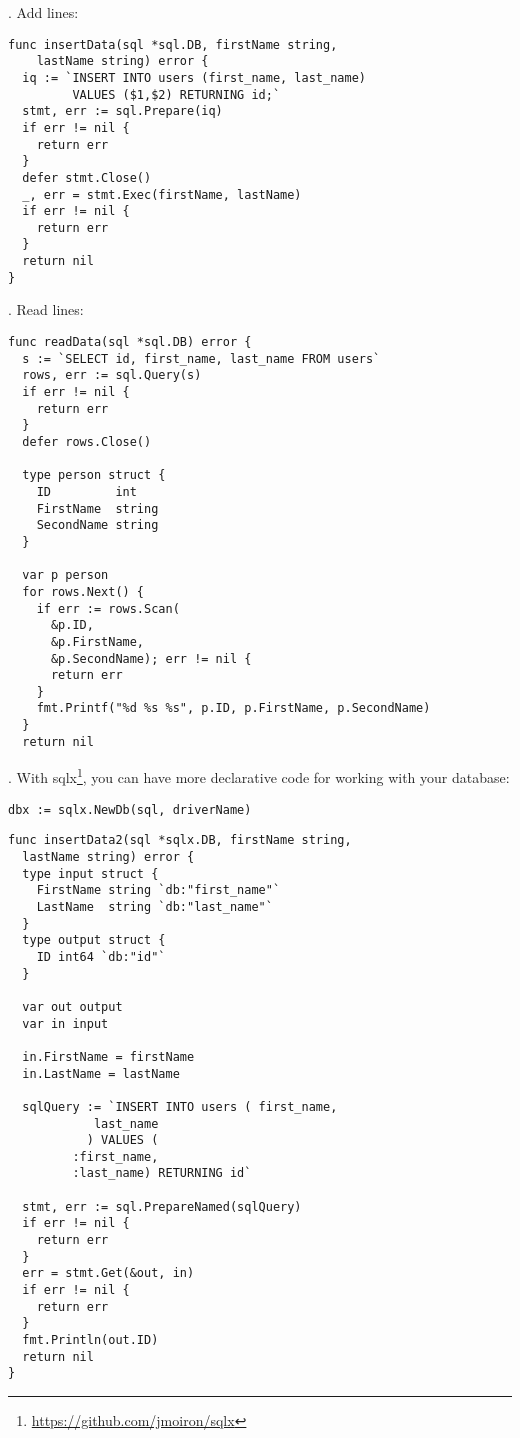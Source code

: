 \documentclass[11pt, letterpaper]{article}
\begin{document}
. Add lines:

\begin{verbatim}
func insertData(sql *sql.DB, firstName string,
    lastName string) error {
  iq := `INSERT INTO users (first_name, last_name)
         VALUES ($1,$2) RETURNING id;`
  stmt, err := sql.Prepare(iq)
  if err != nil {
    return err
  }
  defer stmt.Close()
  _, err = stmt.Exec(firstName, lastName)
  if err != nil {
    return err
  }
  return nil
}
\end{verbatim}


. Read lines:

\begin{verbatim}
func readData(sql *sql.DB) error {
  s := `SELECT id, first_name, last_name FROM users`
  rows, err := sql.Query(s)
  if err != nil {
    return err
  }
  defer rows.Close()

  type person struct {
    ID         int
    FirstName  string
    SecondName string
  }

  var p person
  for rows.Next() {
    if err := rows.Scan(
      &p.ID,
      &p.FirstName,
      &p.SecondName); err != nil {
      return err
    }
    fmt.Printf("%d %s %s", p.ID, p.FirstName, p.SecondName)
  }
  return nil
\end{verbatim}

. With sqlx\footnote{\href{https://github.com/jmoiron/sqlx}{https://github.com/jmoiron/sqlx}}, you can have more declarative code for working with your database:

\begin{verbatim}
dbx := sqlx.NewDb(sql, driverName)
\end{verbatim}

\begin{verbatim}
func insertData2(sql *sqlx.DB, firstName string,
  lastName string) error {
  type input struct {
    FirstName string `db:"first_name"`
    LastName  string `db:"last_name"`
  }
  type output struct {
    ID int64 `db:"id"`
  }

  var out output
  var in input

  in.FirstName = firstName
  in.LastName = lastName

  sqlQuery := `INSERT INTO users ( first_name,
            last_name
           ) VALUES (
         :first_name,
         :last_name) RETURNING id`

  stmt, err := sql.PrepareNamed(sqlQuery)
  if err != nil {
    return err
  }
  err = stmt.Get(&out, in)
  if err != nil {
    return err
  }
  fmt.Println(out.ID)
  return nil
}
\end{verbatim}
\end{document}

